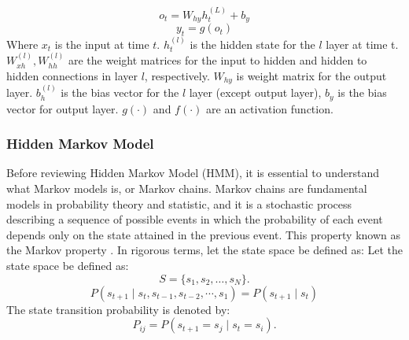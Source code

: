 \documentclass[12pt,a4paper]{article}
\begin{document}
\begin{equation}
    o_t = W_{hy}h^{(L)}_{t} + b_y
\end{equation}
\begin{equation}
    y_t = g(o_t)
\end{equation}
Where $x_t$ is the input at time $t$. $h^{(l)}_{t}$ is the hidden state for the $l$ layer at time t. $W^{(l)}_{xh}, W^{(l)}_{hh}$ are the weight matrices for the input to hidden and hidden to hidden connections in layer $l$, respectively. $W_{hy}$ is weight matrix for the output layer. $b^{(l)}_h$ is the bias vector for the $l$ layer (except output layer), $b_y$ is the bias vector for output layer. $g(\cdot)$ and $f(\cdot)$ are an activation function. 

\newpage
\subsubsection{Hidden Markov Model}
Before reviewing Hidden Markov Model (HMM), it is essential to understand what Markov models is, or Markov chains. Markov chains are fundamental models in probability theory and statistic, and it is a stochastic process describing a sequence of possible events in which the probability of each event depends only on the state attained in the previous event. This property known as the Markov property \parencite{roberts2004general}. In rigorous terms, let the state space be defined as:
Let the state space be defined as:
\begin{equation}
    S = \{ s_1, s_2, \dots, s_N \}.
\end{equation}
\begin{equation}
    P(s_{t+1} \mid s_t, s_{t-1}, s_{t-2}, \cdots, s_{1}) = P(s_{t+1} \mid s_t)
\end{equation}
The state transition probability is denoted by:
\begin{equation}
    P_{ij} = P(s_{t+1} = s_j \mid s_t = s_i).
\end{equation}
\end{document}
